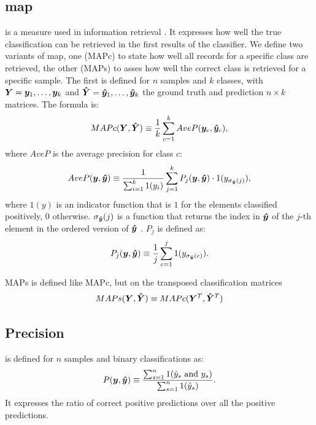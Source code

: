\subsection{\acf{map}} is a measure used in information
retrieval \cite{manning_introduction_2008}. It expresses how well the
true classification can be retrieved in 
the first results of the classifier. We define two variants of
\ac{map}, one (MAPc) to state how well all records for a specific class are
retrieved, the other (MAPs) to asses how well the correct class is retrieved
for a specific sample. The first is defined for $n$ samples and $k$ classes,
with $\bm{Y}=\bm{y}_1,\dots,\bm{y}_k$ and $\bm{\hat
  Y}=\bm{\hat y}_1,\dots,\bm{\hat y}_k$ the ground truth and
prediction $n\times k$ matrices. The formula is:
\begin{equation*}
  MAPc(\bm{Y}, \bm{\hat Y})\equiv
  \frac{1}{k}\sum_{c=1}^{k}AveP(\bm{y}_c, \bm{\hat y}_c),
\end{equation*}
where $AveP$ is the average precision for class $c$:
\begin{equation*}
  AveP(\bm{y}, \bm{\hat y}) \equiv
  \frac{1}{\sum_{i=1}^k 1(y_i)}\sum_{j=1}^k P_j(\bm{y}, \bm{\hat y})\cdot 1(y_{\sigma_{\bm{\hat y}}(j)}),
\end{equation*}
where $1(y)$ is an indicator
function that is $1$ for the elements classified positively, $0$
otherwise. $\sigma_{\bm{\hat y}}(j)$ is a function that returns the
  index in $\bm{\hat y}$ of the $j$-th element in the ordered
  version of $\bm{\hat y}$ . $P_j$ is defined as:
\begin{equation*}
P_j(\bm{y}, \bm{\hat y}) \equiv \frac{1}{j}\sum_{c=1}^j
1(y_{\sigma_{\bm{\hat y}}(c)}).
\end{equation*}

MAPs is defined like MAPc, but on the transposed classification
matrices
\begin{equation*}
  MAPs(\bm{Y}, \bm{\hat Y})\equiv
  MAPc(\bm{Y}^T, \bm{\hat Y}^T)
\end{equation*}

\subsection{Precision} is defined for $n$ samples and binary
classifications as:
\begin{equation}\label{eq:precision}
P(\bm{y}, \bm{\hat y}) \equiv \frac{\sum_{s=1}^n 1(\hat
  y_s \text{ and }y_s)}{\sum_{s=1}^n 1(\hat y_s)}.
\end{equation}
It expresses the ratio of correct positive predictions over all the
positive predictions.

